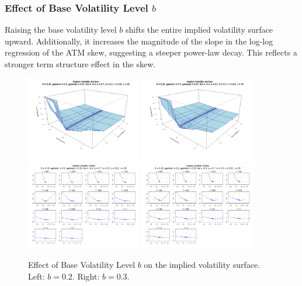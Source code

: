 \subsubsection*{Effect of Base Volatility Level $b$}
Raising the base volatility level $b$ shifts the entire implied volatility surface upward. Additionally, it increases the magnitude of the slope in the log-log regression of the ATM skew, suggesting a steeper power-law decay. This reflects a stronger term structure effect in the skew.
\begin{figure}[H]
    \centering
    \includegraphics[width=0.45\textwidth]{figures/5.2 Individual Parameter Effects/b=0.2_iv_surface.png}
	\includegraphics[width=0.45\textwidth]{figures/5.2 Individual Parameter Effects/b=0.3_iv_surface.png}
	\includegraphics[width=0.45\textwidth]{figures/5.2 Individual Parameter Effects/b=0.2_iv_smiles.png}
	\includegraphics[width=0.45\textwidth]{figures/5.2 Individual Parameter Effects/b=0.3_iv_smiles.png}
    \caption{Effect of Base Volatility Level $b$ on the implied volatility surface. Left: $b=0.2$. Right: $b=0.3$.}
    \label{fig:b_effect}
\end{figure}

